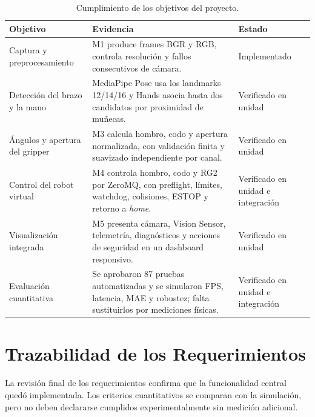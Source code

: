 \begin{table}[H]
    \centering
    \renewcommand{\arraystretch}{1.2}
    \small
    \begin{tabularx}{\textwidth}{p{3.2cm} X p{2.6cm}}
        \toprule
        \textbf{Objetivo} & \textbf{Evidencia} & \textbf{Estado} \\
        \midrule
        Captura y preprocesamiento &
        M1 produce frames BGR y RGB, controla resolución y fallos consecutivos
        de cámara. & Implementado \\
        Detección del brazo y la mano &
        MediaPipe Pose usa los landmarks 12/14/16 y Hands asocia hasta dos
        candidatos por proximidad de muñecas. & Verificado en unidad \\
        Ángulos y apertura del gripper &
        M3 calcula hombro, codo y apertura normalizada, con validación finita y
        suavizado independiente por canal. & Verificado en unidad \\
        Control del robot virtual &
        M4 controla hombro, codo y RG2 por ZeroMQ, con preflight, límites,
        watchdog, colisiones, ESTOP y retorno a \textit{home}. &
        Verificado en unidad e integración \\
        Visualización integrada &
        M5 presenta cámara, Vision Sensor, telemetría, diagnósticos y acciones
        de seguridad en un dashboard responsivo. & Verificado en unidad \\
        Evaluación cuantitativa &
        Se aprobaron 87 pruebas automatizadas y se simularon FPS, latencia, MAE
        y robustez; falta sustituirlos por mediciones físicas. &
        Verificado en unidad e integración \\
        \bottomrule
    \end{tabularx}
    \caption{Cumplimiento de los objetivos del proyecto.}
    \label{tab:cumplimiento_objetivos}
\end{table}

\section{Trazabilidad de los Requerimientos}
\label{sec:trazabilidad_requerimientos}

La revisión final de los requerimientos confirma que la funcionalidad central
quedó implementada. Los criterios cuantitativos se comparan con la simulación,
pero no deben declararse cumplidos experimentalmente sin medición adicional.

